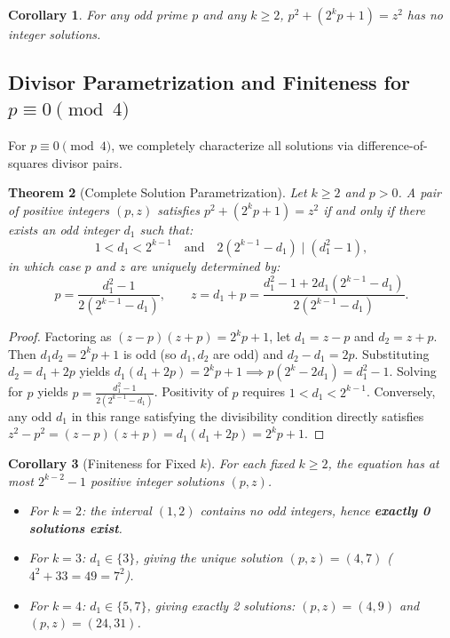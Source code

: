 \documentclass[11pt,a4paper]{article}
\newtheorem{theorem}{Theorem}
\newtheorem{corollary}[theorem]{Corollary}
\begin{document}
\begin{corollary}
For any odd prime $p$ and any $k \ge 2$, $p^2 + (2^k p + 1) = z^2$ has no integer solutions.
\end{corollary}

\subsection{Divisor Parametrization and Finiteness for $p \equiv 0 \pmod 4$}
For $p \equiv 0 \pmod 4$, we completely characterize all solutions via difference-of-squares divisor pairs.

\begin{theorem}[Complete Solution Parametrization] \label{thm:param}
Let $k \ge 2$ and $p > 0$. A pair of positive integers $(p, z)$ satisfies $p^2 + (2^k p + 1) = z^2$ if and only if there exists an odd integer $d_1$ such that:
\begin{equation} \label{eq:param_condition}
1 < d_1 < 2^{k-1} \quad \text{and} \quad 2(2^{k-1} - d_1) \mid (d_1^2 - 1),
\end{equation}
in which case $p$ and $z$ are uniquely determined by:
\begin{equation} \label{eq:pz_formula}
p = \frac{d_1^2 - 1}{2(2^{k-1} - d_1)}, \qquad z = d_1 + p = \frac{d_1^2 - 1 + 2d_1(2^{k-1} - d_1)}{2(2^{k-1} - d_1)}.
\end{equation}
\end{theorem}
\begin{proof}
Factoring as $(z - p)(z + p) = 2^k p + 1$, let $d_1 = z - p$ and $d_2 = z + p$. Then $d_1 d_2 = 2^k p + 1$ is odd (so $d_1, d_2$ are odd) and $d_2 - d_1 = 2p$.
Substituting $d_2 = d_1 + 2p$ yields $d_1(d_1 + 2p) = 2^k p + 1 \implies p(2^k - 2d_1) = d_1^2 - 1$.
Solving for $p$ yields $p = \frac{d_1^2 - 1}{2(2^{k-1} - d_1)}$.
Positivity of $p$ requires $1 < d_1 < 2^{k-1}$.
Conversely, any odd $d_1$ in this range satisfying the divisibility condition directly satisfies $z^2 - p^2 = (z-p)(z+p) = d_1(d_1 + 2p) = 2^k p + 1$.
\end{proof}

\begin{corollary}[Finiteness for Fixed $k$]
For each fixed $k \ge 2$, the equation has at most $2^{k-2} - 1$ positive integer solutions $(p, z)$.
\begin{itemize}
  \item For $k=2$: the interval $(1, 2)$ contains no odd integers, hence \textbf{exactly 0 solutions exist}.
  \item For $k=3$: $d_1 \in \{3\}$, giving the unique solution $(p, z) = (4, 7)$ ($4^2 + 33 = 49 = 7^2$).
  \item For $k=4$: $d_1 \in \{5, 7\}$, giving exactly 2 solutions: $(p, z) = (4, 9)$ and $(p, z) = (24, 31)$.
\end{itemize}
\end{corollary}
\end{document}
